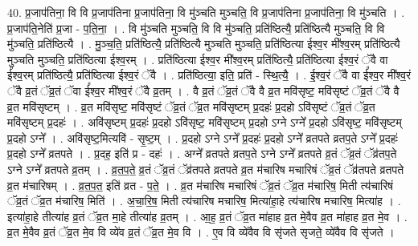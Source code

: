 \documentclass[17pt]{extarticle}
\begin{document}
40. प्र॒जाप॑तिना॒ वि वि प्र॒जाप॑तिना प्र॒जाप॑तिना॒ वि मु॑ञ्चति मुञ्चति॒ वि प्र॒जाप॑तिना प्र॒जाप॑तिना॒ वि मु॑ञ्चति । . प्र॒जाप॑ति॒नेति॑ प्र॒जा - प॒ति॒ना॒ । . वि मु॑ञ्चति मुञ्चति॒ वि वि मु॑ञ्चति॒ प्रति॑ष्ठित्यै॒ प्रति॑ष्ठित्यै मुञ्चति॒ वि वि मु॑ञ्चति॒ प्रति॑ष्ठित्यै । . मु॒ञ्च॒ति॒ प्रति॑ष्ठित्यै॒ प्रति॑ष्ठित्यै मुञ्चति मुञ्चति॒ प्रति॑ष्ठित्या ईश्व॒र मी᳚श्व॒रम् प्रति॑ष्ठित्यै मुञ्चति मुञ्चति॒ प्रति॑ष्ठित्या ईश्व॒रम् । . प्रति॑ष्ठित्या ईश्व॒र मी᳚श्व॒रम् प्रति॑ष्ठित्यै॒ प्रति॑ष्ठित्या ईश्व॒रं ॅवै वा ई᳚श्व॒रम् प्रति॑ष्ठित्यै॒ प्रति॑ष्ठित्या ईश्व॒रं ॅवै । . प्रति॑ष्ठित्या॒ इति॒ प्रति॑ - स्थि॒त्यै॒ । . ई॒श्व॒रं ॅवै वा ई᳚श्व॒र मी᳚श्व॒रं ॅवै व्र॒तं ॅव्र॒तं ॅवा ई᳚श्व॒र मी᳚श्व॒रं ॅवै व्र॒तम् । . वै व्र॒तं ॅव्र॒तं ॅवै वै व्र॒त मवि॑सृष्ट॒ मवि॑सृष्टं ॅव्र॒तं ॅवै वै व्र॒त मवि॑सृष्टम् । . व्र॒त मवि॑सृष्ट॒ मवि॑सृष्टं ॅव्र॒तं ॅव्र॒त मवि॑सृष्टम् प्र॒दहः॑ प्र॒दहो ऽवि॑सृष्टं ॅव्र॒तं ॅव्र॒त मवि॑सृष्टम् प्र॒दहः॑ । . अवि॑सृष्टम् प्र॒दहः॑ प्र॒दहो ऽवि॑सृष्ट॒ मवि॑सृष्टम् प्र॒दहो ऽग्ने ऽग्ने᳚ प्र॒दहो ऽवि॑सृष्ट॒ मवि॑सृष्टम् प्र॒दहो ऽग्ने᳚ । . अवि॑सृष्ट॒मित्यवि॑ - सृ॒ष्ट॒म् । . प्र॒दहो ऽग्ने ऽग्ने᳚ प्र॒दहः॑ प्र॒दहो ऽग्ने᳚ व्रतपते व्रतप॒ते ऽग्ने᳚ प्र॒दहः॑ प्र॒दहो ऽग्ने᳚ व्रतपते । . प्र॒दह॒ इति॑ प्र - दहः॑ । . अग्ने᳚ व्रतपते व्रतप॒ते ऽग्ने ऽग्ने᳚ व्रतपते व्र॒तं ॅव्र॒तं ॅव्र॑तप॒ते ऽग्ने ऽग्ने᳚ व्रतपते व्र॒तम् । . व्र॒त॒प॒ते॒ व्र॒तं ॅव्र॒तं ॅव्र॑तपते व्रतपते व्र॒त म॑चारिष मचारिषं ॅव्र॒तं ॅव्र॑तपते व्रतपते व्र॒त म॑चारिषम् । . व्र॒त॒प॒त॒ इति॑ व्रत - प॒ते॒ । . व्र॒त म॑चारिष मचारिषं ॅव्र॒तं ॅव्र॒त म॑चारिष॒ मिती त्य॑चारिषं ॅव्र॒तं ॅव्र॒त म॑चारिष॒ मिति॑ । . अ॒चा॒रि॒ष॒ मिती त्य॑चारिष मचारिष॒ मित्या॑हा॒हे त्य॑चारिष मचारिष॒ मित्या॑ह । . इत्या॑हा॒हे तीत्या॑ह व्र॒तं ॅव्र॒त मा॒हे तीत्या॑ह व्र॒तम् । . आ॒ह॒ व्र॒तं ॅव्र॒त मा॑हाह व्र॒त मे॒वैव व्र॒त मा॑हाह व्र॒त मे॒व । . व्र॒त मे॒वैव व्र॒तं ॅव्र॒त मे॒व वि व्ये॑व व्र॒तं ॅव्र॒त मे॒व वि । . ए॒व वि व्ये॑वैव वि सृ॑जते सृजते॒ व्ये॑वैव वि सृ॑जते । \newline
\pagebreak
{}
\end{document}
